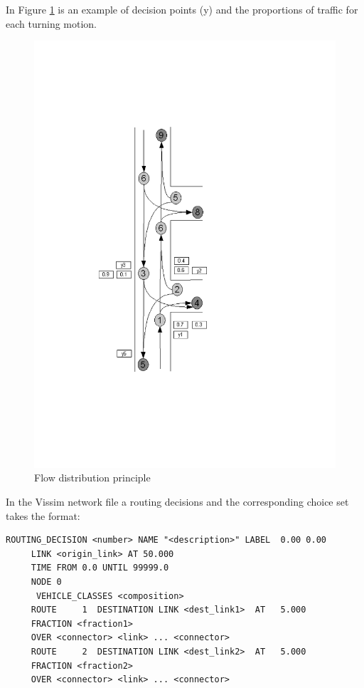 In Figure \ref{fig:flow_dist_principle} is an example of decision points (y) and the proportions of traffic for each turning motion.
\begin{figure}[ht]
\centering
\includegraphics[scale=0.6]{trafficcount_to_routes_sketch.png} 
\caption{Flow distribution principle}
\label{fig:flow_dist_principle}
\end{figure}

In the Vissim network file a routing decisions and the corresponding choice set takes the format:

\begin{verbatim}
ROUTING_DECISION <number> NAME "<description>" LABEL  0.00 0.00
     LINK <origin_link> AT 50.000
     TIME FROM 0.0 UNTIL 99999.0
     NODE 0
      VEHICLE_CLASSES <composition>
     ROUTE     1  DESTINATION LINK <dest_link1>  AT   5.000
     FRACTION <fraction1>
     OVER <connector> <link> ... <connector>
     ROUTE     2  DESTINATION LINK <dest_link2>  AT   5.000
     FRACTION <fraction2>
     OVER <connector> <link> ... <connector>
\end{verbatim}


